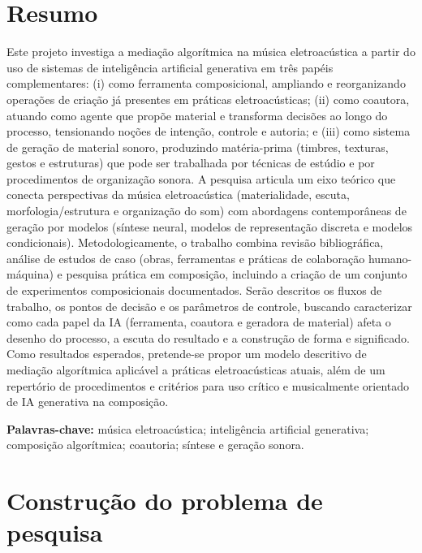 \chapter*{Resumo}

Este projeto investiga a mediação algorítmica na música eletroacústica a partir do uso de sistemas de inteligência artificial generativa em três papéis complementares: (i) como ferramenta composicional, ampliando e reorganizando operações de criação já presentes em práticas eletroacústicas; (ii) como coautora, atuando como agente que propõe material e transforma decisões ao longo do processo, tensionando noções de intenção, controle e autoria; e (iii) como sistema de geração de material sonoro, produzindo matéria-prima (timbres, texturas, gestos e estruturas) que pode ser trabalhada por técnicas de estúdio e por procedimentos de organização sonora. A pesquisa articula um eixo teórico que conecta perspectivas da música eletroacústica (materialidade, escuta, morfologia/estrutura e organização do som) com abordagens contemporâneas de geração por modelos (síntese neural, modelos de representação discreta e modelos condicionais). Metodologicamente, o trabalho combina revisão bibliográfica, análise de estudos de caso (obras, ferramentas e práticas de colaboração humano-máquina) e pesquisa prática em composição, incluindo a criação de um conjunto de experimentos composicionais documentados. Serão descritos os fluxos de trabalho, os pontos de decisão e os parâmetros de controle, buscando caracterizar como cada papel da IA (ferramenta, coautora e geradora de material) afeta o desenho do processo, a escuta do resultado e a construção de forma e significado. Como resultados esperados, pretende-se propor um modelo descritivo de mediação algorítmica aplicável a práticas eletroacústicas atuais, além de um repertório de procedimentos e critérios para uso crítico e musicalmente orientado de IA generativa na composição.

\vspace{1em}
\noindent\textbf{Palavras-chave:}
música eletroacústica; inteligência artificial generativa; composição algorítmica; coautoria; síntese e geração sonora.


\newpage

\chapter{Construção do problema de pesquisa}

